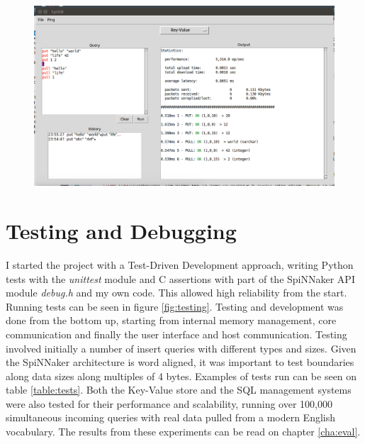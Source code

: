 \begin{figure}
\center
  \includegraphics[width=1\linewidth, natwidth=1036, natheight=622]{images/GUI.png}
  \label{fig:gui}
\end{figure}

\section{Testing and Debugging}
I started the project with a Test-Driven Development approach, writing Python tests with the \textit{unittest} module and C assertions with part of the SpiNNaker API module \textit{debug.h} and my own code. This allowed high reliability from the start. Running tests can be seen in figure \ref{fig:testing}. Testing and development was done from the bottom up, starting from internal memory management, core communication and finally the user interface and host communication.
Testing involved initially a number of insert queries with different types and sizes. Given the SpiNNaker architecture is word aligned, it was important to test boundaries along data sizes along multiples of 4 bytes. Examples of tests run can be seen on table \ref{table:tests}.
Both the Key-Value store and the SQL management systems were also tested for their performance and scalability, running over 100,000 simultaneous incoming queries with real data pulled from a modern English vocabulary. The results from these experiments can be read on chapter \ref{cha:eval}.

